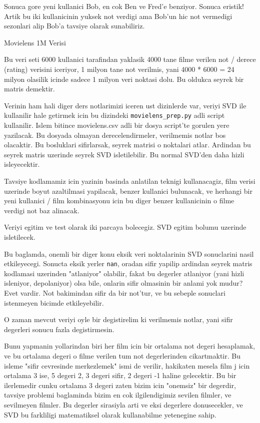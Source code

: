 \documentclass[12pt,fleqn]{article}\usepackage{../common}
\begin{document}
Sonuca gore yeni kullanici Bob, en cok Ben ve Fred'e benziyor. Sonuca
eristik! Artik bu iki kullanicinin yuksek not verdigi ama Bob'un hic
not vermedigi sezonlari alip Bob'a tavsiye olarak sunabiliriz.

Movielens 1M Verisi

Bu veri seti 6000 kullanici tarafindan yaklasik 4000 tane filme
verilen not / derece (rating) verisini iceriyor, 1 milyon tane not
verilmis, yani 4000 * 6000 = 24 milyon olasilik icinde sadece 1 milyon
veri noktasi dolu. Bu oldukca seyrek bir matris demektir.

Verinin ham hali diger ders notlarimizi iceren ust dizinlerde var, veriyi
SVD ile kullanilir hale getirmek icin bu dizindeki \verb!movielens_prep.py!
adli script kullanilir. Islem bitince movielens.csv adli bir dosya
script'te gorulen yere yazilacak. Bu dosyada olmayan derecelendirmeler,
verilmemis notlar bos olacaktir. Bu bosluklari sifirlarsak, seyrek matrisi
o noktalari atlar. Ardindan bu seyrek matris uzerinde seyrek SVD
isletilebilir. Bu normal SVD'den daha hizli isleyecektir.

Tavsiye kodlamamiz icin yazinin basinda anlatilan teknigi
kullanacagiz, film verisi uzerinde boyut azaltilmasi yapilacak, benzer
kullanici bulunacak, ve herhangi bir yeni kullanici / film
kombinasyonu icin bu diger benzer kullanicinin o filme verdigi not
baz alinacak. 

Veriyi egitim ve test olarak iki parcaya bolecegiz. SVD egitim bolumu
uzerinde isletilecek.

Bu baglamda, onemli bir diger konu eksik veri noktalarinin SVD
sonuclarini nasil etkileyecegi. Sonucta eksik yerler \verb!nan!,
oradan sifir yapilip ardindan seyrek matris kodlamasi uzerinden
"atlaniyor" olabilir, fakat bu degerler atlaniyor (yani hizli
isleniyor, depolaniyor) olsa bile, onlarin sifir olmasinin bir anlami
yok mudur? Evet vardir. Not bakimindan sifir da bir not'tur, ve bu
sebeple sonuclari istenmeyen bicimde etkileyebilir.

O zaman mevcut veriyi oyle bir degistirelim ki verilmemis notlar, yani
sifir degerleri sonucu fazla degistirmesin.

Bunu yapmanin yollarindan biri her film icin bir ortalama not degeri
hesaplamak, ve bu ortalama degeri o filme verilen tum not
degerlerinden cikartmaktir. Bu isleme "sifir cevresinde merkezlemek"
ismi de verilir, hakikaten mesela film j icin ortalama 3 ise, 5 degeri
2, 3 degeri sifir, 2 degeri -1 haline gelecektir. Bu bir ilerlemedir
cunku ortalama 3 degeri zaten bizim icin "onemsiz" bir degerdir,
tavsiye problemi baglaminda bizim en cok ilgilendigimiz sevilen
filmler, ve sevilmeyen filmler. Bu degerler sirasiyla arti ve eksi
degerlere donusecekler, ve SVD bu farkliligi matematiksel olarak
kullanabilme yetenegine sahip.
\end{document}
